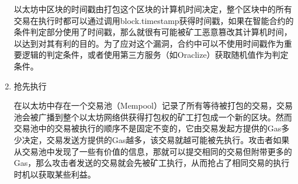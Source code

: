 \begin{enumerate}[label=\Alph*., align=left, leftmargin=*]
    以太坊中区块的时间戳由打包这个区块的计算机时间决定，整个区块中的所有交易在执行时都可以通过调用block.timestamp获得时间戳，如果在智能合约的条件判定部分使用了时间戳，那么就很有可能被矿工恶意篡改其计算机时间，以达到对其有利的目的。为了应对这个漏洞，合约中可以不使用时间戳作为重要逻辑的判定条件，或者使用第三方服务（如Oraclize）获取随机值作为判定条件。
    \item 抢先执行
    
    在以太坊中存在一个交易池（Mempool）记录了所有等待被打包的交易，交易池会被广播到整个以太坊网络供获得打包权的矿工打包成一个新的区块。然而交易池中的交易被执行的顺序不是固定不变的，它由交易发起方提供的Gas多少决定，交易发送方提供的Gas越多，该交易就越可能被先执行。攻击者如果从交易池中发现了一些有价值的信息，那就可以提交相同的交易但附带更多的Gas，那么攻击者发送的交易就会先被矿工执行，从而抢占了相同交易的执行时机以获取某些利益。
\end{enumerate}
